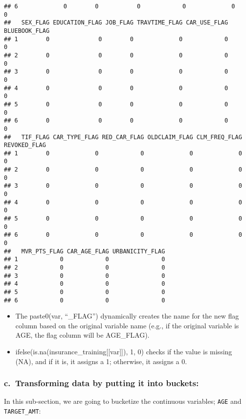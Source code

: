 \documentclass[
]{article}
\begin{document}
\begin{verbatim}
## 6             0        0           0            0             0            0
##   SEX_FLAG EDUCATION_FLAG JOB_FLAG TRAVTIME_FLAG CAR_USE_FLAG BLUEBOOK_FLAG
## 1        0              0        0             0            0             0
## 2        0              0        0             0            0             0
## 3        0              0        0             0            0             0
## 4        0              0        0             0            0             0
## 5        0              0        0             0            0             0
## 6        0              0        0             0            0             0
##   TIF_FLAG CAR_TYPE_FLAG RED_CAR_FLAG OLDCLAIM_FLAG CLM_FREQ_FLAG REVOKED_FLAG
## 1        0             0            0             0             0            0
## 2        0             0            0             0             0            0
## 3        0             0            0             0             0            0
## 4        0             0            0             0             0            0
## 5        0             0            0             0             0            0
## 6        0             0            0             0             0            0
##   MVR_PTS_FLAG CAR_AGE_FLAG URBANICITY_FLAG
## 1            0            0               0
## 2            0            0               0
## 3            0            0               0
## 4            0            0               0
## 5            0            0               0
## 6            0            0               0
\end{verbatim}

\begin{itemize}
\item
  The paste0(var, ``\_FLAG'') dynamically creates the name for the new
  flag column based on the original variable name (e.g., if the original
  variable is AGE, the flag column will be AGE\_FLAG).
\item
  ifelse(is.na(insurance\_training{[}{[}var{]}{]}), 1, 0) checks if the
  value is missing (NA), and if it is, it assigns a 1; otherwise, it
  assigns a 0.
\end{itemize}

\subsubsection{c.~Transforming data by putting it into
buckets:}\label{c.-transforming-data-by-putting-it-into-buckets}

In this sub-section, we are going to bucketize the continuous variables;
\texttt{AGE} and \texttt{TARGET\_AMT}:
\end{document}
